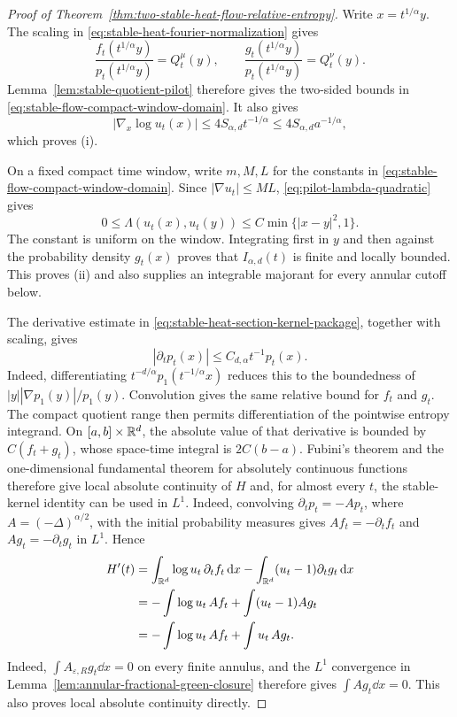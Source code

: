 \begin{proof}[Proof of Theorem~\ref{thm:two-stable-heat-flow-relative-entropy}]
Write \(x=t^{1/\alpha}y\).  The scaling in
\eqref{eq:stable-heat-fourier-normalization} gives
\[
 \frac{f_t(t^{1/\alpha}y)}{p_t(t^{1/\alpha}y)}=Q_t^\mu(y),
 \qquad
 \frac{g_t(t^{1/\alpha}y)}{p_t(t^{1/\alpha}y)}=Q_t^\nu(y).
\]
Lemma~\ref{lem:stable-quotient-pilot} therefore gives the two-sided bounds
in \eqref{eq:stable-flow-compact-window-domain}.  It also gives
\[
 |\nabla_x\log u_t(x)|
 \le4S_{\alpha,d}t^{-1/\alpha}
 \le4S_{\alpha,d}a^{-1/\alpha},
\]
which proves \textup{(i)}.

On a fixed compact time window, write \(m,M,L\) for the constants in
\eqref{eq:stable-flow-compact-window-domain}.  Since
\(|\nabla u_t|\le ML\), \eqref{eq:pilot-lambda-quadratic} gives
\begin{equation}\label{eq:stable-flow-bregman-majorant}
 0\le\Lambda(u_t(x),u_t(y))\le
 C\min\{|x-y|^2,1\}.
\end{equation}
The constant is uniform on the window.  Integrating first in \(y\) and then
against the probability density \(g_t(x)\) proves that
\(I_{\alpha,d}(t)\) is finite and locally bounded.  This proves
\textup{(ii)} and also supplies an integrable majorant for every annular
cutoff below.

The derivative estimate in
\eqref{eq:stable-heat-section-kernel-package}, together with scaling, gives
\begin{equation}\label{eq:stable-kernel-relative-time-derivative}
 |\partial_t p_t(x)|\le C_{d,\alpha}t^{-1}p_t(x).
\end{equation}
Indeed, differentiating \(t^{-d/\alpha}p_1(t^{-1/\alpha}x)\) reduces this to
the boundedness of
\(|y||\nabla p_1(y)|/p_1(y)\).  Convolution gives the same relative bound
for \(f_t\) and \(g_t\).  The compact quotient range then permits
differentiation of the pointwise entropy integrand.  On
\([a,b]\times\mathbb{R}^d\), the absolute value of that derivative is bounded by
\(C(f_t+g_t)\), whose space-time integral is \(2C(b-a)\).  Fubini's theorem
and the one-dimensional fundamental theorem for absolutely continuous
functions therefore give local absolute continuity of \(H\) and, for almost
every \(t\), the stable-kernel identity can be used in \(L^1\).  Indeed,
convolving \(\partial_t p_t=-Ap_t\), where
\(A=(-\Delta)^{\alpha/2}\), with the initial probability measures gives
\(Af_t=-\partial_t f_t\) and \(Ag_t=-\partial_t g_t\) in \(L^1\).  Hence
\begin{align}
 H'(t)
 &=\int_{\mathbb{R}^d}\log u_t\,\partial_t f_t\,\mathrm{d} x
 -\int_{\mathbb{R}^d}(u_t-1)\partial_tg_t\,\mathrm{d} x\notag\\
 &=-\int\log u_t\,Af_t+\int(u_t-1)Ag_t\notag\\
 &=-\int\log u_t\,Af_t+\int u_t\,Ag_t.
 \label{eq:stable-flow-l1-chain-rule}
\end{align}
Indeed, \(\int A_{\varepsilon,R}g_t\dd x=0\) on every finite annulus,
and the \(L^1\) convergence in
Lemma~\ref{lem:annular-fractional-green-closure} therefore gives
\(\int Ag_t\dd x=0\).  This also proves local absolute continuity directly.


\end{proof}
